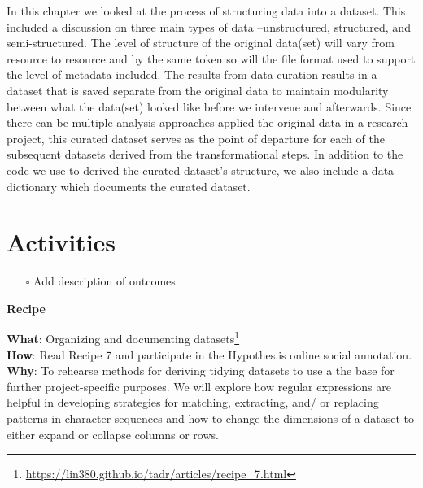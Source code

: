 \documentclass[
  letterpaper,
  DIV=11,
  numbers=noendperiod]{scrreport}
\providecommand{\tightlist}{%
  \setlength{\itemsep}{0pt}\setlength{\parskip}{0pt}}\usepackage{longtable,booktabs,array}
\theoremstyle{definition}
\theoremstyle{remark}
\DeclareRobustCommand{\href}[2]{#2\footnote{\url{#1}}}
\begin{document}
In this chapter we looked at the process of structuring data into a
dataset. This included a discussion on three main types of data
--unstructured, structured, and semi-structured. The level of structure
of the original data(set) will vary from resource to resource and by the
same token so will the file format used to support the level of metadata
included. The results from data curation results in a dataset that is
saved separate from the original data to maintain modularity between
what the data(set) looked like before we intervene and afterwards. Since
there can be multiple analysis approaches applied the original data in a
research project, this curated dataset serves as the point of departure
for each of the subsequent datasets derived from the transformational
steps. In addition to the code we use to derived the curated dataset's
structure, we also include a data dictionary which documents the curated
dataset.

\hypertarget{activities-4}{%
\section*{Activities}\label{activities-4}}


\begin{itemize}
\tightlist
\item[$\square$]
   Add description of outcomes
\end{itemize}

\begin{tcolorbox}[enhanced jigsaw, breakable, colback=white, rightrule=.15mm, arc=.35mm, left=2mm, toprule=.15mm, leftrule=.75mm, bottomrule=.15mm, opacityback=0]

\textbf{ Recipe}

\textbf{What}:
\href{https://lin380.github.io/tadr/articles/recipe_7.html}{Organizing
and documenting datasets}\\
\textbf{How}: Read Recipe 7 and participate in the Hypothes.is online
social annotation.\\
\textbf{Why}: To rehearse methods for deriving tidying datasets to use a
the base for further project-specific purposes. We will explore how
regular expressions are helpful in developing strategies for matching,
extracting, and/ or replacing patterns in character sequences and how to
change the dimensions of a dataset to either expand or collapse columns
or rows.

\end{tcolorbox}
\end{document}
